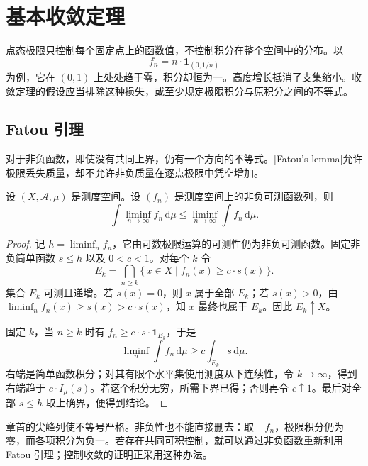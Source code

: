 \section{基本收敛定理}
\label{b1:sec:0503}

点态极限只控制每个固定点上的函数值，不控制积分在整个空间中的分布。以
\[
f_n=n\cdot\mathbf1_{(0,1/n)}
\]
为例，它在 \((0,1)\) 上处处趋于零，积分却恒为一。高度增长抵消了支集缩小。收敛定理的假设应当排除这种损失，或至少规定极限积分与原积分之间的不等式。

\subsection{Fatou 引理}
\label{b1:subsec:050301}

对于非负函数，即使没有共同上界，仍有一个方向的不等式。[Fatou's lemma]允许极限丢失质量，却不允许非负质量在逐点极限中凭空增加。

\begin{lemma}[Fatou]\label{b1:thm:fatou}
设 \((X,\mathcal A,\mu)\) 是测度空间。设 \((f_n)\) 是测度空间上的非负可测函数列，则
\[
\int\liminf_{n\to\infty}f_n\,\mathrm d\mu
\leq\liminf_{n\to\infty}\int f_n\,\mathrm d\mu.
\]
\end{lemma}
\begin{proof}
记 \(h=\liminf_n f_n\)，它由可数极限运算的可测性仍为非负可测函数。固定非负简单函数 \(s\leq h\) 以及 \(0<c<1\)。对每个 \(k\) 令
\[
E_k=\bigcap_{n\geq k}\{\,x\in X\mid f_n(x)\geq c\cdot s(x)\,\}.
\]
集合 \(E_k\) 可测且递增。若 \(s(x)=0\)，则 \(x\) 属于全部 \(E_k\)；若 \(s(x)>0\)，由 \(\liminf_n f_n(x)\geq s(x)>c\cdot s(x)\)，知 \(x\) 最终也属于 \(E_k\)。因此 \(E_k\uparrow X\)。

固定 \(k\)，当 \(n\geq k\) 时有 \(f_n\geq c\cdot s\cdot\mathbf1_{E_k}\)，于是
\[
\liminf_n\int f_n\,\mathrm d\mu\geq c\int_{E_k}s\,\mathrm d\mu.
\]
右端是简单函数积分；对其有限个水平集使用测度从下连续性，令 \(k\to\infty\)，得到右端趋于 \(c\cdot I_\mu(s)\)。若这个积分无穷，所需下界已得；否则再令 \(c\uparrow1\)。最后对全部 \(s\leq h\) 取上确界，便得到结论。
\end{proof}

章首的尖峰列使不等号严格。非负性也不能直接删去：取 \(-f_n\)，极限积分仍为零，而各项积分为负一。若存在共同可积控制，就可以通过非负函数重新利用 Fatou 引理；控制收敛的证明正采用这种办法。

